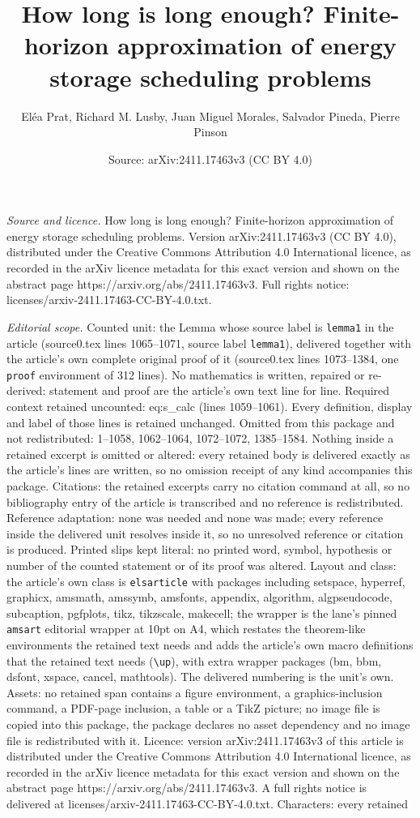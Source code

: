 \documentclass[10pt,a4paper]{amsart}
\title[How long is long enough? Finite-horizon approximation of ene]{How long is long enough? Finite-horizon approximation of energy storage scheduling problems}
\author{El\'ea Prat, Richard M. Lusby, Juan Miguel Morales, Salvador Pineda, Pierre Pinson}
\date{Source: arXiv:2411.17463v3 (CC BY 4.0)}
\begin{document}
\maketitle

\noindent\emph{Source and licence.} How long is long enough? Finite-horizon approximation of energy storage scheduling problems. Version arXiv:2411.17463v3 (CC BY 4.0), distributed under the Creative Commons Attribution 4.0 International licence, as recorded in the arXiv licence metadata for this exact version and shown on the abstract page https://arxiv.org/abs/2411.17463v3. Full rights notice: licenses/arxiv-2411.17463-CC-BY-4.0.txt.\par\smallskip

\noindent\textit{Editorial scope.} Counted unit: the Lemma whose source label is \texttt{lemma1} in the article (source0.tex lines 1065--1071, source label \texttt{lemma1}), delivered together with the article's own complete original proof of it (source0.tex lines 1073--1384, one \texttt{proof} environment of 312 lines). No mathematics is written, repaired or re-derived: statement and proof are the article's own text line for line. Required context retained uncounted: eq:s\_calc (lines 1059--1061). Every definition, display and label of those lines is retained unchanged. Omitted from this package and not redistributed: 1--1058, 1062--1064, 1072--1072, 1385--1584. Nothing inside a retained excerpt is omitted or altered: every retained body is delivered exactly as the article's lines are written, so no omission receipt of any kind accompanies this package. Citations: the retained excerpts carry no citation command at all, so no bibliography entry of the article is transcribed and no reference is redistributed. Reference adaptation: none was needed and none was made; every reference inside the delivered unit resolves inside it, so no unresolved reference or citation is produced. Printed slips kept literal: no printed word, symbol, hypothesis or number of the counted statement or of its proof was altered. Layout and class: the article's own class is \texttt{elsarticle} with packages including setspace, hyperref, graphicx, amsmath, amssymb, amsfonts, appendix, algorithm, algpseudocode, subcaption, pgfplots, tikz, tikzscale, makecell; the wrapper is the lane's pinned \texttt{amsart} editorial wrapper at 10pt on A4, which restates the theorem-like environments the retained text needs and adds the article's own macro definitions that the retained text needs (\texttt{\textbackslash up}), with extra wrapper packages (bm, bbm, dsfont, xspace, cancel, mathtools). The delivered numbering is the unit's own. Assets: no retained span contains a figure environment, a graphics-inclusion command, a PDF-page inclusion, a table or a TikZ picture; no image file is copied into this package, the package declares no asset dependency and no image file is redistributed with it. Licence: version arXiv:2411.17463v3 of this article is distributed under the Creative Commons Attribution 4.0 International licence, as recorded in the arXiv licence metadata for this exact version and shown on the abstract page https://arxiv.org/abs/2411.17463v3. A full rights notice is delivered at licenses/arxiv-2411.17463-CC-BY-4.0.txt. Characters: every retained 
\end{document}
